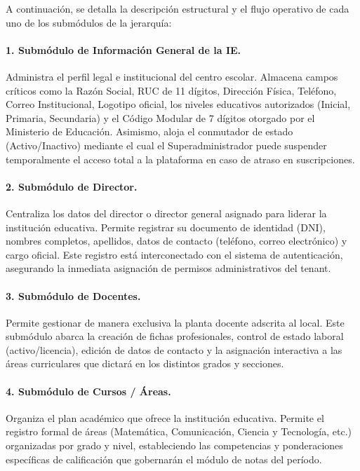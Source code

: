 \documentclass[12pt,a4paper,oneside]{report}
\begin{document}
A continuación, se detalla la descripción estructural y el flujo operativo de cada uno de los submódulos de la jerarquía:

\paragraph{1. Submódulo de Información General de la IE.} Administra el perfil legal e institucional del centro escolar. Almacena campos críticos como la Razón Social, RUC de 11 dígitos, Dirección Física, Teléfono, Correo Institucional, Logotipo oficial, los niveles educativos autorizados (Inicial, Primaria, Secundaria) y el Código Modular de 7 dígitos otorgado por el Ministerio de Educación. Asimismo, aloja el conmutador de estado (Activo/Inactivo) mediante el cual el Superadministrador puede suspender temporalmente el acceso total a la plataforma en caso de atraso en suscripciones.

\paragraph{2. Submódulo de Director.} Centraliza los datos del director o director general asignado para liderar la institución educativa. Permite registrar su documento de identidad (DNI), nombres completos, apellidos, datos de contacto (teléfono, correo electrónico) y cargo oficial. Este registro está interconectado con el sistema de autenticación, asegurando la inmediata asignación de permisos administrativos del tenant.

\paragraph{3. Submódulo de Docentes.} Permite gestionar de manera exclusiva la planta docente adscrita al local. Este submódulo abarca la creación de fichas profesionales, control de estado laboral (activo/licencia), edición de datos de contacto y la asignación interactiva a las áreas curriculares que dictará en los distintos grados y secciones.

\paragraph{4. Submódulo de Cursos / Áreas.} Organiza el plan académico que ofrece la institución educativa. Permite el registro formal de áreas (Matemática, Comunicación, Ciencia y Tecnología, etc.) organizadas por grado y nivel, estableciendo las competencias y ponderaciones específicas de calificación que gobernarán el módulo de notas del período.
\end{document}
